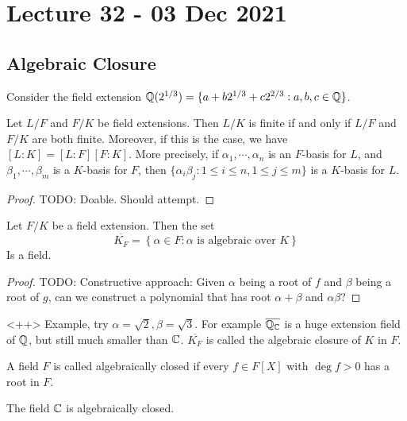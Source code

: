 \section{Lecture 32 - 03 Dec 2021}
\subsection{Algebraic Closure}
\begin{example}
  Consider the field extension $\mathbb Q(2^{1/3})=\{a+b2^{1/3} + c2^{2/3} : a,b,c\in\mathbb Q\}$.
\end{example}
\begin{theorem}
  Let $L/F$ and $F/K$ be field extensions. Then $L/K$ is finite if and only if $L/F$ and
  $F/K$ are both finite. Moreover, if this is the case, we have $[L:K]=[L:F][F:K]$. More
  precisely, if $\alpha_1,\cdots, \alpha_n$ is an $F$-basis for $L$, and $\beta_1,\cdots,
  \beta_m$ is a $K$-basis for $F$, then $\{\alpha_i\beta_j : 1\leq i\leq n, 1\leq j\leq
  m\}$ is a $K$-basis for $L$.
\end{theorem}
\begin{proof}
  TODO: Doable. Should attempt.
\end{proof}

\begin{theorem}
  Let $F/K$ be a field extension. Then the set
  \[\overline{K_F} = \left\{ \alpha\in F : \alpha\text{ is algebraic over } K\right\}\]
  Is a field.
  \label{<+label+>}
\end{theorem}
\begin{proof}
  TODO: Constructive approach: Given $\alpha$ being a root of $f$ and $\beta$ being a root
  of $g$, can we construct a polynomial that has root $\alpha+\beta$ and $\alpha\beta$?
\end{proof}<++>
Example, try $\alpha=\sqrt{2}, \beta=\sqrt{3}$. For example $\overline{\mathbb Q_{\mathbb C}}$ is a
huge extension field of $\mathbb Q$, but still much smaller than $\mathbb C$.
$\overline{K_F}$ is called the algebraic closure of $K$ in $F$.
\begin{definition}
  A field $F$ is called algebraically closed if every $f\in F[X]$ with $\deg f>0$ has a
  root in $F$.
  \label{<+label+>}
\end{definition}

\begin{theorem}
  The field $\mathbb C$ is algebraically closed.
  \label{thm:FTAlg}
\end{theorem}

